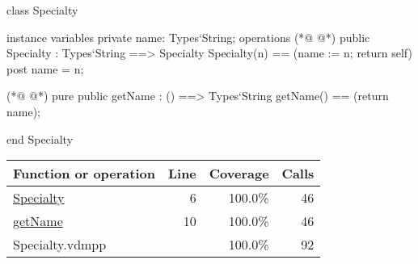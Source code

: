 \begin{vdmpp}[breaklines=true]
class Specialty

instance variables
  private name: Types`String;
operations
(*@
\label{Specialty:6}
@*)
 public Specialty : Types`String ==> Specialty
  Specialty(n) == (name := n; return self)
 post name = n;
  
(*@
\label{getName:10}
@*)
 pure public getName : () ==> Types`String
  getName() == (return name);

end Specialty
\end{vdmpp}
\bigskip
\begin{longtable}{|l|r|r|r|}
\hline
Function or operation & Line & Coverage & Calls \\
\hline
\hline
\hyperref[Specialty:6]{Specialty} & 6&100.0\% & 46 \\
\hline
\hyperref[getName:10]{getName} & 10&100.0\% & 46 \\
\hline
\hline
Specialty.vdmpp & & 100.0\% & 92 \\
\hline
\end{longtable}

